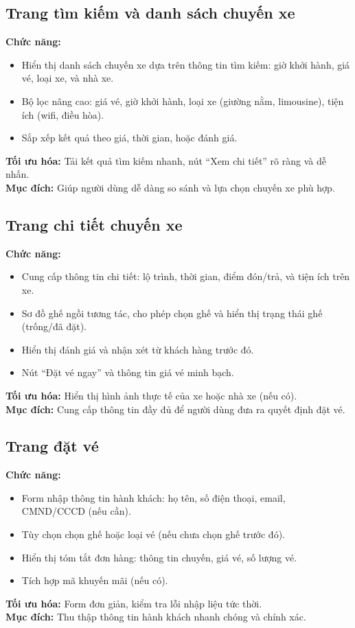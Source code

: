 \subsection*{Trang tìm kiếm và danh sách chuyến xe}
\textbf{Chức năng:}
\begin{itemize}
    \item Hiển thị danh sách chuyến xe dựa trên thông tin tìm kiếm: giờ khởi hành, giá vé, loại xe, và nhà xe.
    \item Bộ lọc nâng cao: giá vé, giờ khởi hành, loại xe (giường nằm, limousine), tiện ích (wifi, điều hòa).
    \item Sắp xếp kết quả theo giá, thời gian, hoặc đánh giá.
\end{itemize}
\textbf{Tối ưu hóa:} Tải kết quả tìm kiếm nhanh, nút ``Xem chi tiết'' rõ ràng và dễ nhấn.\\
\textbf{Mục đích:} Giúp người dùng dễ dàng so sánh và lựa chọn chuyến xe phù hợp.

\subsection*{Trang chi tiết chuyến xe}
\textbf{Chức năng:}
\begin{itemize}
    \item Cung cấp thông tin chi tiết: lộ trình, thời gian, điểm đón/trả, và tiện ích trên xe.
    \item Sơ đồ ghế ngồi tương tác, cho phép chọn ghế và hiển thị trạng thái ghế (trống/đã đặt).
    \item Hiển thị đánh giá và nhận xét từ khách hàng trước đó.
    \item Nút ``Đặt vé ngay'' và thông tin giá vé minh bạch.
\end{itemize}
\textbf{Tối ưu hóa:} Hiển thị hình ảnh thực tế của xe hoặc nhà xe (nếu có).\\
\textbf{Mục đích:} Cung cấp thông tin đầy đủ để người dùng đưa ra quyết định đặt vé.

\subsection*{Trang đặt vé}
\textbf{Chức năng:}
\begin{itemize}
    \item Form nhập thông tin hành khách: họ tên, số điện thoại, email, CMND/CCCD (nếu cần).
    \item Tùy chọn chọn ghế hoặc loại vé (nếu chưa chọn ghế trước đó).
    \item Hiển thị tóm tắt đơn hàng: thông tin chuyến, giá vé, số lượng vé.
    \item Tích hợp mã khuyến mãi (nếu có).
\end{itemize}
\textbf{Tối ưu hóa:} Form đơn giản, kiểm tra lỗi nhập liệu tức thời.\\
\textbf{Mục đích:} Thu thập thông tin hành khách nhanh chóng và chính xác.

